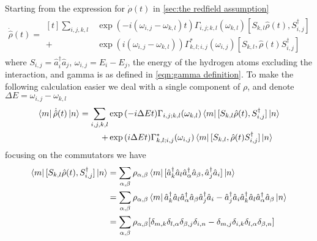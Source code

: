 Starting from the
expression for \(\dot{\rho}(t)\)
in \cref{sec:the redfield assumption}
\begin{align}
    \dot{\hat{\rho}}(t) = \begin{aligned}[t]
        \sum_{i,j,k, l} &
        \exp{(-i(\omega_{i,j}-\omega_{k,l})t)}
        \Gamma_{i,j;k, l}(\omega_{k,l})
        [S_{k, l}\hat{\rho}(t),
        S^\dagger_{i,j}]                                       \\
        +               & \exp{(i(\omega_{i,j}-\omega_{k,l}))}
        \Gamma^*_{k, l; i,j}(\omega_{i,j})
        [S_{k, l},
            \hat{\rho}(t) S^\dagger_{i,j}]
    \end{aligned}
\end{align}
where \(S_{i,j}= \hat{a}^\dagger_i \hat{a}_j\),
\(\omega_{i,j} = E_i - E_j\), the energy of
the hydrogen atoms excluding the interaction, and
gamma is as defined in
\cref{eqn:gamma definition}. To
make the following calculation easier we deal
with a single component of \(\rho \), and
denote \(\Delta{}E = \omega_{i,j}-\omega_{k,l}\)
\begin{align}
    \bra{m}\dot{\hat{\rho}}(t) \ket{n} = \begin{aligned}[t]
        \sum_{i,j,k, l} &
        \exp{(-i\Delta{}Et)}
        \Gamma_{i,j;k, l}(\omega_{k,l})
        \bra{m}[S_{k, l}\hat{\rho}(t),
        S^\dagger_{i,j}] \ket{n}               \\
        +               & \exp{(i\Delta{}E t)}
        \Gamma^*_{k, l; i,j}(\omega_{i,j})
        \bra{m}[S_{k, l},
            \hat{\rho}(t) S^\dagger_{i,j}]\ket{n}
    \end{aligned}
\end{align}
focusing on the commutators we have
\begin{align}
    \bra{m}[S_{k, l}\hat{\rho}(t),
    S^\dagger_{i, j}] \ket{n} & =
    \sum_{\alpha, \beta} \rho_{\alpha, \beta}\bra{m}
    [\hat{a}^\dagger_k \hat{a}_l
        \hat{a}^\dagger_\alpha \hat{a}_\beta,
        \hat{a}^\dagger_j \hat{a}_i]
    \ket{n}                       \\
                              & =
    \sum_{\alpha, \beta} \rho_{\alpha, \beta}\bra{m}
    \hat{a}^\dagger_k \hat{a}_l
    \hat{a}^\dagger_\alpha \hat{a}_\beta
    \hat{a}^\dagger_j \hat{a}_i
    -
    \hat{a}^\dagger_j \hat{a}_i
    \hat{a}^\dagger_k \hat{a}_l
    \hat{a}^\dagger_\alpha \hat{a}_\beta
    \ket{n}                       \\
                              & =
    \sum_{\alpha, \beta} \rho_{\alpha, \beta} [
        \delta_{m, k}\delta_{l, \alpha}
        \delta_{\beta, j}\delta_{i, n}
        -\delta_{m, j}\delta_{i, k}
        \delta_{l, \alpha}\delta_{\beta, n}]
\end{align}
